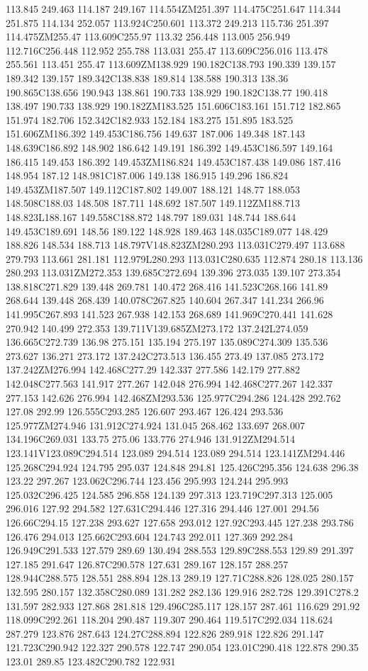 113.845 249.463 114.187 249.167 114.554ZM251.397 114.475C251.647 114.344 251.875 114.134 252.057 113.924C250.601 113.372 249.213 115.736 251.397 114.475ZM255.47 113.609C255.97 113.32 256.448 113.005 256.949 112.716C256.448 112.952 255.788 113.031 255.47 113.609C256.016 113.478 255.561 113.451 255.47 113.609ZM138.929 190.182C138.793 190.339 139.157 189.342 139.157 189.342C138.838 189.814 138.588 190.313 138.36 190.865C138.656 190.943 138.861 190.733 138.929 190.182C138.77 190.418 138.497 190.733 138.929 190.182ZM183.525 151.606C183.161 151.712 182.865 151.974 182.706 152.342C182.933 152.184 183.275 151.895 183.525 151.606ZM186.392 149.453C186.756 149.637 187.006 149.348 187.143 148.639C186.892 148.902 186.642 149.191 186.392 149.453C186.597 149.164 186.415 149.453 186.392 149.453ZM186.824 149.453C187.438 149.086 187.416 148.954 187.12 148.981C187.006 149.138 186.915 149.296 186.824 149.453ZM187.507 149.112C187.802 149.007 188.121 148.77 188.053 148.508C188.03 148.508 187.711 148.692 187.507 149.112ZM188.713 148.823L188.167 149.558C188.872 148.797 189.031 148.744 188.644 149.453C189.691 148.56 189.122 148.928 189.463 148.035C189.077 148.429 188.826 148.534 188.713 148.797V148.823ZM280.293 113.031C279.497 113.688 279.793 113.661 281.181 112.979L280.293 113.031C280.635 112.874 280.18 113.136 280.293 113.031ZM272.353 139.685C272.694 139.396 273.035 139.107 273.354 138.818C271.829 139.448 269.781 140.472 268.416 141.523C268.166 141.89 268.644 139.448 268.439 140.078C267.825 140.604 267.347 141.234 266.96 141.995C267.893 141.523 267.938 142.153 268.689 141.969C270.441 141.628 270.942 140.499 272.353 139.711V139.685ZM273.172 137.242L274.059 136.665C272.739 136.98 275.151 135.194 275.197 135.089C274.309 135.536 273.627 136.271 273.172 137.242C273.513 136.455 273.49 137.085 273.172 137.242ZM276.994 142.468C277.29 142.337 277.586 142.179 277.882 142.048C277.563 141.917 277.267 142.048 276.994 142.468C277.267 142.337 277.153 142.626 276.994 142.468ZM293.536 125.977C294.286 124.428 292.762 127.08 292.99 126.555C293.285 126.607 293.467 126.424 293.536 125.977ZM274.946 131.912C274.924 131.045 268.462 133.697 268.007 134.196C269.031 133.75 275.06 133.776 274.946 131.912ZM294.514 123.141V123.089C294.514 123.089 294.514 123.089 294.514 123.141ZM294.446 125.268C294.924 124.795 295.037 124.848 294.81 125.426C295.356 124.638 296.38 123.22 297.267 123.062C296.744 123.456 295.993 124.244 295.993 125.032C296.425 124.585 296.858 124.139 297.313 123.719C297.313 125.005 296.016 127.92 294.582 127.631C294.446 127.316 294.446 127.001 294.56 126.66C294.15 127.238 293.627 127.658 293.012 127.92C293.445 127.238 293.786 126.476 294.013 125.662C293.604 124.743 292.011 127.369 292.284 126.949C291.533 127.579 289.69 130.494 288.553 129.89C288.553 129.89 291.397 127.185 291.647 126.87C290.578 127.631 289.167 128.157 288.257 128.944C288.575 128.551 288.894 128.13 289.19 127.71C288.826 128.025 280.157 132.595 280.157 132.358C280.089 131.282 282.136 129.916 282.728 129.391C278.2 131.597 282.933 127.868 281.818 129.496C285.117 128.157 287.461 116.629 291.92 118.099C292.261 118.204 290.487 119.307 290.464 119.517C292.034 118.624 287.279 123.876 287.643 124.27C288.894 122.826 289.918 122.826 291.147 121.723C290.942 122.327 290.578 122.747 290.054 123.01C290.418 122.878 290.35 123.01 289.85 123.482C290.782 122.931 